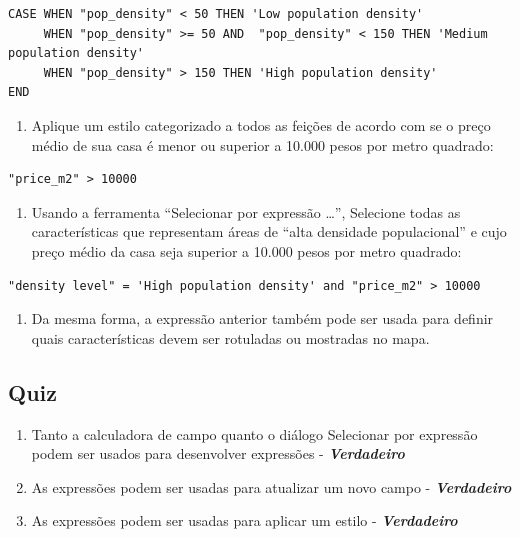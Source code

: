 \documentclass[
]{krantz}
\providecommand{\tightlist}{%
  \setlength{\itemsep}{0pt}\setlength{\parskip}{0pt}}
\begin{document}
\begin{verbatim}
CASE WHEN "pop_density" < 50 THEN 'Low population density'
     WHEN "pop_density" >= 50 AND  "pop_density" < 150 THEN 'Medium population density'
     WHEN "pop_density" > 150 THEN 'High population density'
END
\end{verbatim}

\begin{enumerate}
\def\labelenumi{\arabic{enumi}.}
\setcounter{enumi}{2}
\tightlist
\item
  Aplique um estilo categorizado a todos as feições de acordo com se o preço médio de sua casa é menor ou superior a 10.000 pesos por metro quadrado:
\end{enumerate}

\begin{verbatim}
"price_m2" > 10000
\end{verbatim}

\begin{enumerate}
\def\labelenumi{\arabic{enumi}.}
\setcounter{enumi}{3}
\tightlist
\item
  Usando a ferramenta ``Selecionar por expressão \ldots{}'', Selecione todas as características que representam áreas de ``alta densidade populacional'' e cujo preço médio da casa seja superior a 10.000 pesos por metro quadrado:
\end{enumerate}

\begin{verbatim}
"density level" = 'High population density' and "price_m2" > 10000
\end{verbatim}

\begin{enumerate}
\def\labelenumi{\arabic{enumi}.}
\setcounter{enumi}{4}
\tightlist
\item
  Da mesma forma, a expressão anterior também pode ser usada para definir quais características devem ser rotuladas ou mostradas no mapa.
\end{enumerate}

\hypertarget{quiz-16}{%
\subsection{Quiz}\label{quiz-16}}

\begin{enumerate}
\def\labelenumi{\arabic{enumi}.}
\tightlist
\item
  Tanto a calculadora de campo quanto o diálogo Selecionar por expressão podem ser usados para desenvolver expressões - \textbf{\emph{Verdadeiro}}
\item
  As expressões podem ser usadas para atualizar um novo campo - \textbf{\emph{Verdadeiro}}
\item
  As expressões podem ser usadas para aplicar um estilo - \textbf{\emph{Verdadeiro}}
\end{enumerate}
\end{document}

